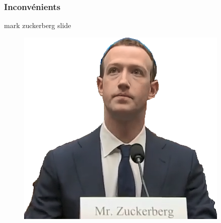 \documentclass[compress]{beamer}
\begin{document}
\begin{frame}
	\frametitle{Inconvénients}
	
	mark zuckerberg slide
		\begin{figure}
			\centering
			\includegraphics[width=0.72\linewidth]{resources/clem/zucc}
		\end{figure}
\end{frame}
\end{document}
